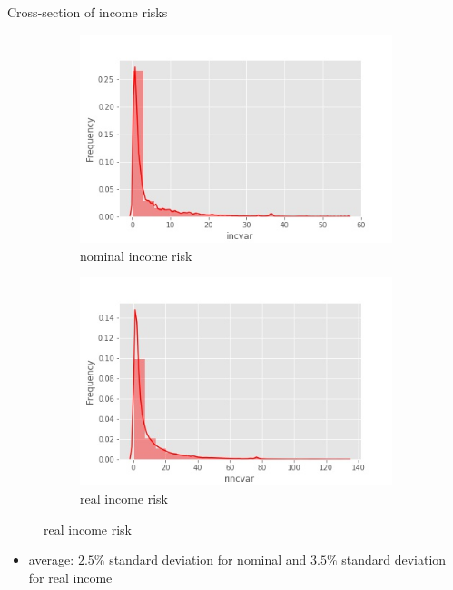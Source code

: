 \documentclass{beamer}
\begin{document}
\begin{frame}{Cross-section of income risks}
	\begin{figure}
		\centering
		\label{incvar_hist}
			\begin{subfigure}[b]{0.45\textwidth}
			\centering
			\caption{nominal income risk}
		\includegraphics[width=\textwidth]{figures/hist_incvar}
		\end{subfigure}
		\begin{subfigure}[b]{0.45\textwidth}
		\centering
		\caption{real income risk}
		\includegraphics[width=\textwidth]{figures/hist_rincvar}
	\end{subfigure}
	\end{figure}
	\begin{itemize}
		\item average:  $2.5\%$ standard deviation for nominal and $3.5\%$ standard deviation for real income
	\end{itemize}
\end{frame}
\end{document}
